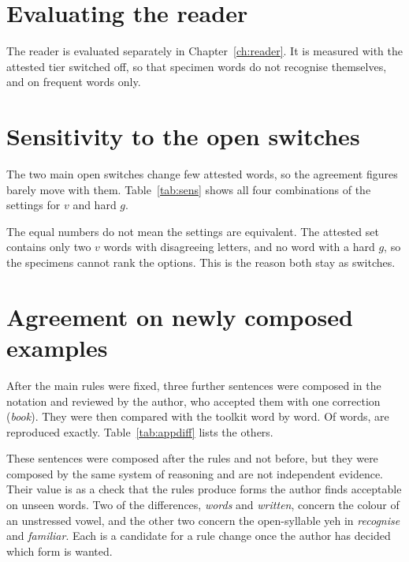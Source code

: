 \section{Evaluating the reader}
The reader is evaluated separately in Chapter~\ref{ch:reader}. It is measured with the attested tier switched off, so that specimen words do not recognise themselves, and on frequent words only.

\section{Sensitivity to the open switches}
The two main open switches change few attested words, so the agreement figures barely move with them. Table~\ref{tab:sens} shows all four combinations of the settings for $v$ and hard $g$.

\begin{table}[ht]\centering\small

\caption{Agreement with the \NAttested{} attested forms under each setting of $v$ and hard $g$.}\label{tab:sens}
\end{table}

The equal numbers do not mean the settings are equivalent. The attested set contains only two $v$ words with disagreeing letters, and no word with a hard $g$, so the specimens cannot rank the options. This is the reason both stay as switches.

\section{Agreement on newly composed examples}
After the main rules were fixed, three further sentences were composed in the notation and reviewed by the author, who accepted them with one correction (\emph{book}). They were then compared with the toolkit word by word. Of \NApprovedWords{} words, \NApprovedSame{} are reproduced exactly. Table~\ref{tab:appdiff} lists the others.

\begin{table}[ht]\centering\small

\caption{Words in the approved sentences that the toolkit writes differently.}\label{tab:appdiff}
\end{table}

These sentences were composed after the rules and not before, but they were composed by the same system of reasoning and are not independent evidence. Their value is as a check that the rules produce forms the author finds acceptable on unseen words. Two of the differences, \emph{words} and \emph{written}, concern the colour of an unstressed vowel, and the other two concern the open-syllable yeh in \emph{recognise} and \emph{familiar}. Each is a candidate for a rule change once the author has decided which form is wanted.

